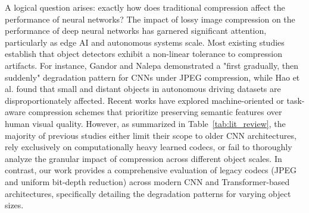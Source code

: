 \documentclass[12pt, a4paper]{article}
\begin{document}
A logical question arises: exactly how does traditional compression affect the performance of neural networks? The impact of lossy image compression on the performance of deep neural networks has garnered significant attention, particularly as edge AI and autonomous systems scale. Most existing studies establish that object detectors exhibit a non-linear tolerance to compression artifacts. For instance, Gandor and Nalepa \cite{gandor2022} demonstrated a "first gradually, then suddenly" degradation pattern for CNNs under JPEG compression, while Hao et al. \cite{hao2022} found that small and distant objects in autonomous driving datasets are disproportionately affected. Recent works have explored machine-oriented or task-aware compression schemes \cite{ye2023, chen2023} that prioritize preserving semantic features over human visual quality. However, as summarized in Table~\ref{tab:lit_review}, the majority of previous studies either limit their scope to older CNN architectures, rely exclusively on computationally heavy learned codecs, or fail to thoroughly analyze the granular impact of compression across different object scales. In contrast, our work provides a comprehensive evaluation of legacy codecs (JPEG and uniform bit-depth reduction) across modern CNN and Transformer-based architectures, specifically detailing the degradation patterns for varying object sizes.
\end{document}
